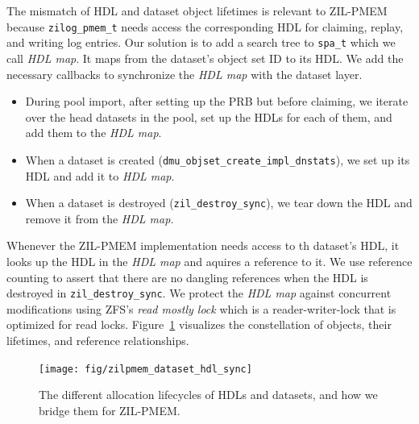 \documentclass[12pt,a4paper,twoside]{book}
\begin{document}
The mismatch of HDL and dataset object lifetimes is relevant to ZIL-PMEM because \lstinline{zilog_pmem_t} needs access the corresponding HDL for claiming, replay, and writing log entries.
Our solution is to add a search tree to \lstinline{spa_t} which we call \textit{HDL map}.
It maps from the dataset's object set ID to its HDL.
We add the necessary callbacks to synchronize the \textit{HDL map} with the dataset layer.
\begin{itemize}[noitemsep]
    \item During pool import, after setting up the PRB but before claiming, we iterate over the head datasets in the pool, set up the HDLs for each of them, and add them to the \textit{HDL map}.
    \item When a dataset is created (\lstinline{dmu_objset_create_impl_dnstats}), we set up its HDL and add it to \textit{HDL map}.
    \item When a dataset is destroyed (\lstinline{zil_destroy_sync}), we tear down the HDL and remove it from the \textit{HDL map}.
\end{itemize}

Whenever the ZIL-PMEM implementation needs access to th dataset's HDL, it looks up the HDL in the \textit{HDL map} and aquires a reference to it.
We use reference counting to assert that there are no dangling references when the HDL is destroyed in \lstinline{zil_destroy_sync}.
We protect the \textit{HDL map} against concurrent modifications using ZFS's \textit{read mostly lock} which is a reader-writer-lock that is optimized for read locks.
Figure~\ref{fig:zilpmem:datasethdlsync} visualizes the constellation of objects, their lifetimes, and reference relationships.

\begin{figure}[H]
    \centering
    \texttt{[image: fig/zilpmem\_dataset\_hdl\_sync]}
    \caption{The different allocation lifecycles of HDLs and datasets, and how we bridge them for ZIL-PMEM.}
    \label{fig:zilpmem:datasethdlsync}
\end{figure}
\end{document}
